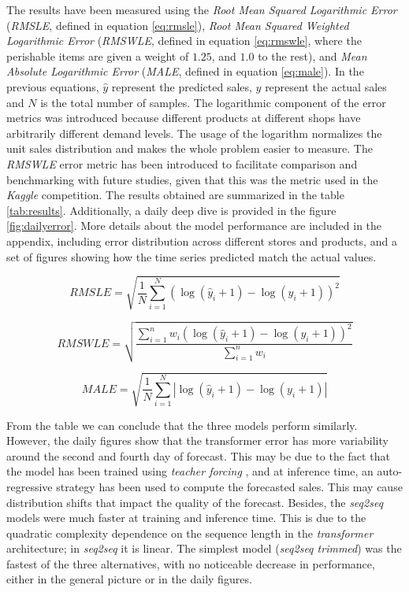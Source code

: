 \documentclass{elsarticle}
\begin{document}
	The results have been measured using the \textit{Root Mean Squared Logarithmic Error} (\textit{RMSLE}, defined in equation \ref{eq:rmsle}), \textit{Root Mean Squared Weighted Logarithmic Error} (\textit{RMSWLE}, defined in equation \ref{eq:rmswle}, where the perishable items are given a weight of $1.25$, and $1.0$ to the rest),  and \textit{Mean Absolute Logarithmic Error} (\textit{MALE}, defined in equation \ref{eq:male}). In the previous equations, $\hat{y}$ represent the predicted sales,  $y$ represent the actual sales and $N$ is the total number of samples. The logarithmic component of the error metrics was introduced because different products at different shops have arbitrarily different demand levels. The usage of the logarithm normalizes the unit sales distribution and makes the whole problem easier to measure. The \textit{RMSWLE} error metric has been introduced to facilitate comparison and benchmarking with future studies, given that this was the metric used in the \textit{Kaggle} competition. The results obtained are summarized in the table \ref{tab:results}. Additionally, a daily deep dive is provided in the figure \ref{fig:dailyerror}. More details about the model performance are included in the appendix, including error distribution across different stores and products, and a set of figures showing how the time series predicted match the actual values.
	
	\begin{equation} \label{eq:rmsle}	
	RMSLE = \sqrt{ \frac{1}{N} \displaystyle\sum_{i=1}^N  \left(\log(\hat{y}_i + 1) - \log(y_i +1)  \right)^2  }
	\end{equation}
	
	\begin{equation} \label{eq:rmswle}	
	RMSWLE = \sqrt{ \frac{\displaystyle\sum_{i=1}^n w_i \left( \log(\hat{y}_i + 1) - \log(y_i +1)  \right)^2  }{\displaystyle\sum_{i=1}^n w_i}}
	\end{equation}
	
	\begin{equation} \label{eq:male}	
	MALE = \sqrt{ \frac{1}{N} \displaystyle\sum_{i=1}^N  \left|\log(\hat{y}_i + 1) - \log(y_i +1)  \right|  }
	\end{equation}
	
	From the table we can conclude that the three models perform similarly. However, the daily figures show that the transformer error has more variability around the second and fourth day of forecast. This may be due to the fact that the model has been trained using \textit{teacher forcing} \cite{williams1989, goyal2016}, and at inference time, an auto-regressive strategy has been used to compute the forecasted sales. This may cause distribution shifts that impact the quality of the forecast.  Besides, the \textit{seq2seq} models were much faster at training and inference time. This is due to the quadratic complexity dependence on the sequence length in the \textit{transformer} architecture; in \textit{seq2seq} it is linear. The simplest model (\textit{seq2seq trimmed}) was the fastest of the three alternatives, with no noticeable decrease in performance, either in the general picture or in the daily figures.
\end{document}
